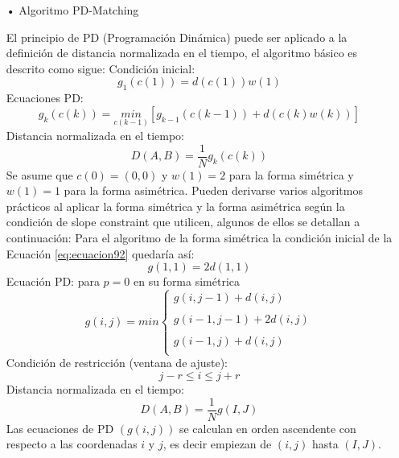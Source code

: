 \begin{enumerate}
\begin{enumerate}
\item[•]Algoritmo PD-Matching
\par
El principio de PD (Programación Dinámica) puede ser aplicado a la definición de distancia normalizada en el tiempo, el algoritmo básico es descrito como sigue:
\vskip 0.5cm
Condición inicial:
\begin{equation}
\label{eq:ecuacion92}
g_{1}(c(1)) = d(c(1))w(1)
\end{equation}
Ecuaciones PD:
\begin{equation}
\label{eq:ecuacion93}
g_{k}(c(k)) = \underset{c(k-1)}{min}[g_{k-1}(c(k - 1)) + d(c(k)w(k))]
\end{equation}
Distancia normalizada en el tiempo:
\begin{equation}
\label{eq:ecuacion94}
D(A,B) = \frac{1}{N}g_{k}(c(k))
\end{equation}
Se asume que $c(0) = (0,0)$ y $w(1) = 2$ para la forma simétrica y $w(1) = 1$ para la forma asimétrica.
\vskip 0.5cm
Pueden derivarse varios algoritmos prácticos al aplicar la forma simétrica y la forma asimétrica según la condición de slope constraint que utilicen, algunos de ellos se detallan a continuación:
\vskip 0.5cm
Para el algoritmo de la forma simétrica la condición inicial de la Ecuación \eqref{eq:ecuacion92} quedaría así:
\begin{equation}
\label{eq:ecuacion95}
g(1,1) = 2d(1,1)
\end{equation}
Ecuación PD: para $p = 0$ en su forma simétrica
\begin{equation}
\label{eq:ecuacion96}
g(i,j) = min \left\{ \begin{array}{lcl}
g(i,j - 1) + d(i,j) \\
\\
g(i - 1 , j - 1) + 2d(i,j) \\
\\
g(i - 1,j) + d(i,j) \\
\end{array}
\right.
\end{equation}
Condición de restricción (ventana de ajuste):
\begin{equation}
\label{eq:ecuacion97}
j - r \leq i \leq j + r
\end{equation}
Distancia normalizada en el tiempo:
\begin{equation}
\label{eq:ecuacion98}
D(A,B) = \frac{1}{N}g(I,J)
\end{equation}
Las ecuaciones de PD $(g(i, j))$ se calculan en orden ascendente con respecto a las coordenadas $i$ y $j$, es decir empiezan de $(i, j)$ hasta $(I, J)$.


\end{enumerate}
\end{enumerate}
